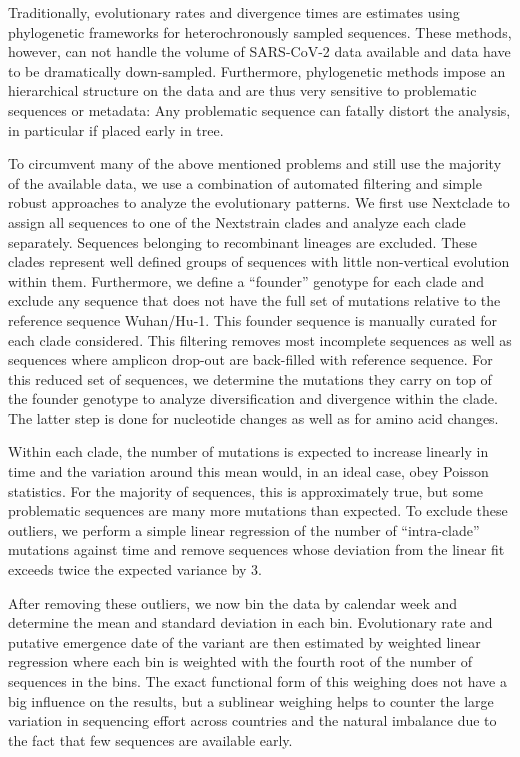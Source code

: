\documentclass[aps,rmp, twocolumn]{revtex4}
\begin{document}
Traditionally, evolutionary rates and divergence times are estimates using phylogenetic frameworks for heterochronously sampled sequences.
These methods, however, can not handle the volume of SARS-CoV-2 data available and data have to be dramatically down-sampled.
Furthermore, phylogenetic methods impose an hierarchical structure on the data and are thus very sensitive to problematic sequences or metadata: Any problematic sequence can fatally distort the analysis, in particular if placed early in tree.

To circumvent many of the above mentioned problems and still use the majority of the available data, we use a combination of automated filtering and simple robust approaches to analyze the evolutionary patterns.
We first use Nextclade \citep{aksamentov_nextclade_2021} to assign all sequences to one of the Nextstrain clades \citep{hadfield_nextstrain_2018} and analyze each clade separately.
Sequences belonging to recombinant lineages are excluded.
These clades represent well defined groups of sequences with little non-vertical evolution within them.
Furthermore, we define a ``founder'' genotype for each clade and exclude any sequence that does not have the full set of mutations relative to the reference sequence Wuhan/Hu-1.
This founder sequence is manually curated for each clade considered.
This filtering removes most incomplete sequences as well as sequences where amplicon drop-out are back-filled with reference sequence.
For this reduced set of sequences, we determine the mutations they carry on top of the founder genotype to analyze diversification and divergence within the clade.
The latter step is done for nucleotide changes as well as for amino acid changes.

Within each clade, the number of mutations is expected to increase linearly in time and the variation around this mean would, in an ideal case, obey Poisson statistics.
For the majority of sequences, this is approximately true, but some problematic sequences are many more mutations than expected.
To exclude these outliers, we perform a simple linear regression of the number of ``intra-clade'' mutations against time and remove sequences whose deviation from the linear fit exceeds twice the expected variance by 3.

After removing these outliers, we now bin the data by calendar week and determine the mean and standard deviation in each bin.
Evolutionary rate and putative emergence date of the variant are then estimated by weighted linear regression where each bin is weighted with the fourth root of the number of sequences in the bins.
The exact functional form of this weighing does not have a big influence on the results, but a sublinear weighing helps to counter the large variation in sequencing effort across countries and the natural imbalance due to the fact that few sequences are available early.
\end{document}
